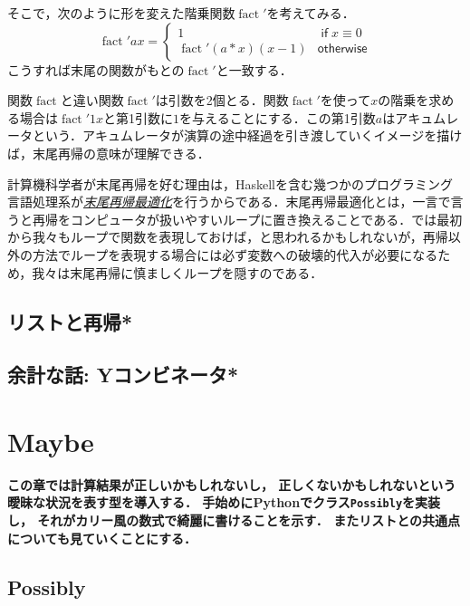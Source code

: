 \documentclass[a5paper,draft]{jsbook}
\newcommand{\programminglanguage}[1]{\textsf{#1}}
\newcommand{\haskell}{\programminglanguage{Haskell}}
\newcommand{\python}{\programminglanguage{Python}}
\newenvironment{leader}{\begingroup\bf}{\endgroup}
\newcommand{\keyword}[1]{{\underline{\emph{#1}}}}
\newcommand{\code}[1]{\texttt{#1}}
\DeclareMathOperator{\mathFactorial}{fact}
\newcommand{\mathKeyword}[1]{\operatorname{\textsf{#1}}}
\newcommand{\mathIf}{\mathKeyword{if}}
\newcommand{\mathOtherwise}{\mathKeyword{otherwise}}
\begin{document}
そこで，次のように形を変えた階乗関数$\mathFactorial'$を考えてみる．
\begin{equation}
\mathFactorial'ax=\begin{cases}
1&\mathIf x\equiv0\\
\mathFactorial'(a*x)(x-1)&\mathOtherwise
\end{cases}
\end{equation}
こうすれば末尾の関数がもとの$\mathFactorial'$と一致する．

関数$\mathFactorial$と違い関数$\mathFactorial'$は引数を2個とる．関数$\mathFactorial'$を使って$x$の階乗を求める場合は$\mathFactorial'1x$と第1引数に$1$を与えることにする．この第1引数$a$はアキュムレータという．アキュムレータが演算の途中経過を引き渡していくイメージを描けば，末尾再帰の意味が理解できる．

計算機科学者が末尾再帰を好む理由は，\haskell を含む幾つかのプログラミング言語処理系が\keyword{末尾再帰最適化}を行うからである．末尾再帰最適化とは，一言で言うと再帰をコンピュータが扱いやすいループに置き換えることである．では最初から我々もループで関数を表現しておけば，と思われるかもしれないが，再帰以外の方法でループを表現する場合には必ず変数への破壊的代入が必要になるため，我々は末尾再帰に慎ましくループを隠すのである．

\section{リストと再帰*}

\section{余計な話: Yコンビネータ*}


\chapter{Maybe}

\begin{leader}
この章では計算結果が正しいかもしれないし，
正しくないかもしれないという曖昧な状況を表す型を導入する．
手始めに\python でクラス\code{Possibly}を実装し，
それがカリー風の数式で綺麗に書けることを示す．
またリストとの共通点についても見ていくことにする．
\end{leader}

\section{Possibly}
\end{document}
